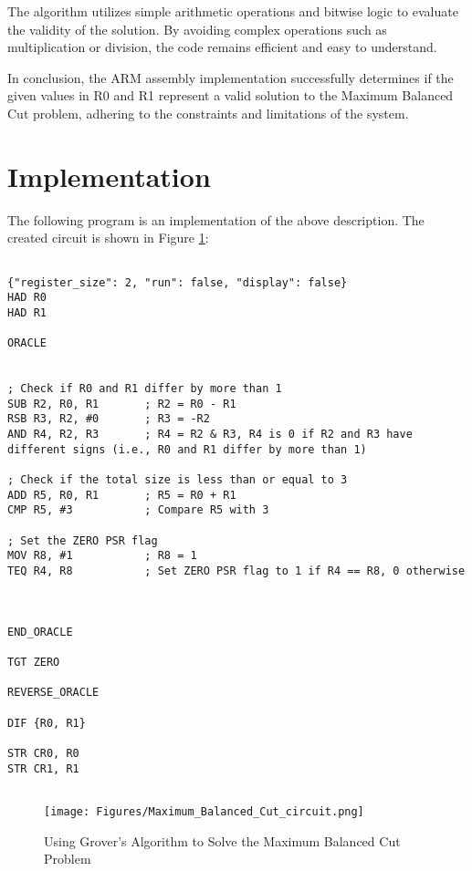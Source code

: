 The algorithm utilizes simple arithmetic operations and bitwise logic to evaluate the validity of the solution. By avoiding complex operations such as multiplication or division, the code remains efficient and easy to understand.

In conclusion, the ARM assembly implementation successfully determines if the given values in R0 and R1 represent a valid solution to the Maximum Balanced Cut problem, adhering to the constraints and limitations of the system.



\section{Implementation}

The following program is an implementation of the above description. The created circuit is shown in Figure \ref{fig:Maximum_Balanced_Cut}:

\begin{lstlisting}

{"register_size": 2, "run": false, "display": false}
HAD R0
HAD R1

ORACLE


; Check if R0 and R1 differ by more than 1
SUB R2, R0, R1       ; R2 = R0 - R1
RSB R3, R2, #0       ; R3 = -R2
AND R4, R2, R3       ; R4 = R2 & R3, R4 is 0 if R2 and R3 have different signs (i.e., R0 and R1 differ by more than 1)

; Check if the total size is less than or equal to 3
ADD R5, R0, R1       ; R5 = R0 + R1
CMP R5, #3           ; Compare R5 with 3

; Set the ZERO PSR flag
MOV R8, #1           ; R8 = 1
TEQ R4, R8           ; Set ZERO PSR flag to 1 if R4 == R8, 0 otherwise



END_ORACLE

TGT ZERO

REVERSE_ORACLE

DIF {R0, R1}

STR CR0, R0
STR CR1, R1


\end{lstlisting}

\begin{figure}[htp]
    \centering
    \texttt{[image: Figures/Maximum\_Balanced\_Cut\_circuit.png]}
    \caption{Using Grover's Algorithm to Solve the Maximum Balanced Cut Problem}
    \label{fig:Maximum_Balanced_Cut}
\end{figure}

